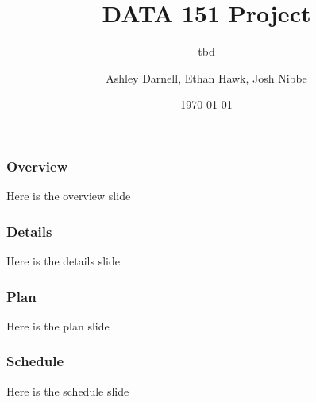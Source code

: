\documentclass{beamer}
\title{DATA 151 Project}
\subtitle{tbd}
\author{Ashley Darnell, Ethan Hawk, Josh Nibbe}
\institute{Valparaiso Unviersity}
\date{\today}
\begin{document}
\begin{frame}
\titlepage
\end{frame}


\begin{frame}
\frametitle{Overview}
Here is the overview slide
\end{frame}


\begin{frame}
\frametitle{Details}
Here is the details slide
\end{frame}


\begin{frame}
\frametitle{Plan}
Here is the plan slide
\end{frame}

\begin{frame}
\frametitle{Schedule}
Here is the schedule slide
\end{frame}
\end{document}
